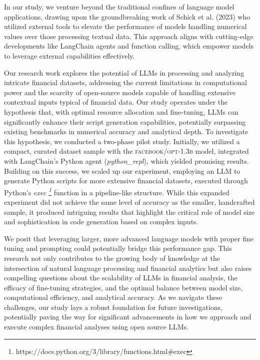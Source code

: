 \documentclass[logo,msc]{infthesis}           %
\begin{document}
In our study, we venture beyond the traditional confines of language model applications, drawing upon the groundbreaking work of Schick et al. (2023) who utilized external tools to elevate the performance of models handling numerical values over those processing textual data. This approach aligns with cutting-edge developments like LangChain agents and function calling, which empower models to leverage external capabilities effectively.

Our research work explores the potential of LLMs in processing and analyzing intricate financial datasets, addressing the current limitations in computational power and the scarcity of open-source models capable of handling extensive contextual inputs typical of financial data. Our study operates under the hypothesis that, with optimal resource allocation and fine-tuning, LLMs can significantly enhance their script generation capabilities, potentially surpassing existing benchmarks in numerical accuracy and analytical depth. To investigate this hypothesis, we conducted a two-phase pilot study. Initially, we utilized a compact, curated dataset sample with the \textsc{facebook/opt-1.3b} model, integrated with LangChain's Python agent (\textit{python\_repl}), which yielded promising results. Building on this success, we scaled up our experiment, employing an LLM to generate Python scripts for more extensive financial datasets, executed through Python's \textit{exec \footnote{https://docs.python.org/3/library/functions.html#exec}} function in a pipeline-like structure. While this expanded experiment did not achieve the same level of accuracy as the smaller, handcrafted sample, it produced intriguing results that highlight the critical role of model size and sophistication in code generation based on complex inputs. 

We posit that leveraging larger, more advanced language models with proper fine tuning and prompting could potentially bridge this performance gap. This research not only contributes to the growing body of knowledge at the intersection of natural language processing and financial analytics but also raises compelling questions about the scalability of LLMs in financial analysis, the efficacy of fine-tuning strategies, and the optimal balance between model size, computational efficiency, and analytical accuracy. As we navigate these challenges, our study lays a robust foundation for future investigations, potentially paving the way for significant advancements in how we approach and execute complex financial analyses using open source LLMs.
\end{document}
